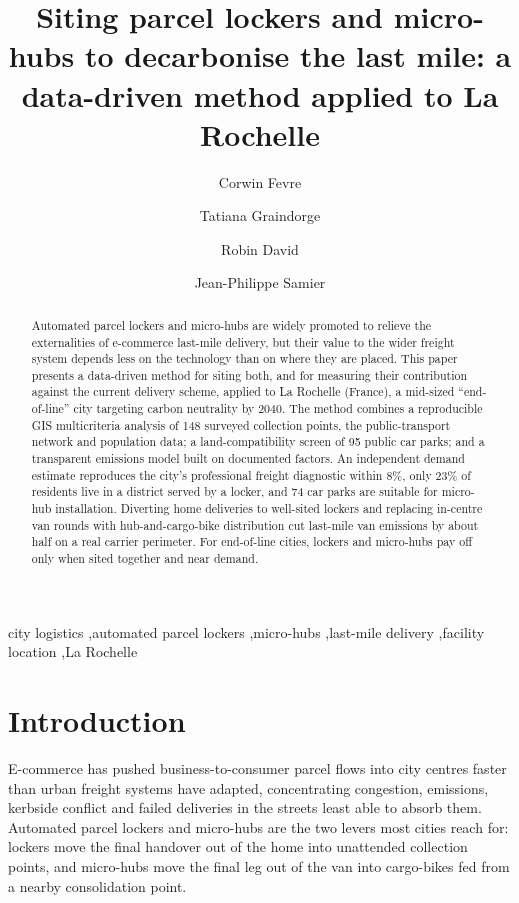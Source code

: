 \documentclass[3p,times]{elsarticle}
\begin{document}
\begin{frontmatter}

\title{Siting parcel lockers and micro-hubs to decarbonise the last mile:
a data-driven method applied to La Rochelle}

\author[eigsi]{Corwin Fevre}
\author[eigsi]{Tatiana Graindorge}
\author[eigsi]{Robin David}
\author[eigsi]{Jean-Philippe Samier}
\address[eigsi]{EIGSI La Rochelle, 26 rue Vaux de Foletier, 17041 La Rochelle, France}

\begin{abstract}
Automated parcel lockers and micro-hubs are widely promoted to relieve the
externalities of e-commerce last-mile delivery, but their value to the wider
freight system depends less on the technology than on where they are placed. This
paper presents a data-driven method for siting both, and for measuring their
contribution against the current delivery scheme, applied to La Rochelle (France),
a mid-sized ``end-of-line'' city targeting carbon neutrality by 2040. The method
combines a reproducible GIS multicriteria analysis of 148 surveyed collection
points, the public-transport network and population data; a land-compatibility
screen of 95 public car parks; and a transparent emissions model built on
documented factors. An independent demand estimate reproduces the city's
professional freight diagnostic within 8\%, only 23\% of residents live in a
district served by a locker, and 74 car parks are suitable for micro-hub
installation. Diverting home deliveries to well-sited lockers and replacing
in-centre van rounds with hub-and-cargo-bike distribution cut last-mile van
emissions by about half on a real carrier perimeter. For end-of-line cities,
lockers and micro-hubs pay off only when sited together and near demand.
\end{abstract}

\begin{keyword}
city logistics \sep automated parcel lockers \sep micro-hubs \sep last-mile
delivery \sep facility location \sep La Rochelle
\end{keyword}
\end{frontmatter}

\section{Introduction}
E-commerce has pushed business-to-consumer parcel flows into city centres faster
than urban freight systems have adapted, concentrating congestion, emissions,
kerbside conflict and failed deliveries in the streets least able to absorb them.
Automated parcel lockers and micro-hubs are the two levers most cities reach for:
lockers move the final handover out of the home into unattended collection points,
and micro-hubs move the final leg out of the van into cargo-bikes fed from a nearby
consolidation point.
\end{document}
